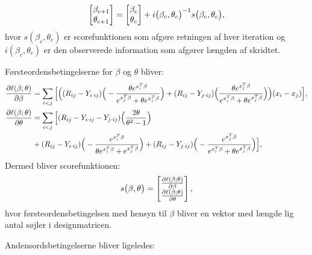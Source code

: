 \documentclass[11pt,a4paper]{article}
\begin{document}
\begin{align*}
\begin{bmatrix} \beta_{c+1}\\\theta_{c+1}\end{bmatrix} = \begin{bmatrix} \beta_c\\\theta_c\end{bmatrix} + i\big{(}\beta_c,\theta_c\big{)}^{-1}s\big{(}\beta_c,\theta_c\big{)},
\end{align*}
hvor $s(\beta_c,\theta_c)$ er scorefunktionen som afgøre retningen af hver iteration og $i(\beta_c,\theta_c)$ er den observerede information som afgører længden af skridtet. \par
Førsteordensbetingelserne for $\beta$ og $\theta$ bliver:
\begin{align*}
\frac{\partial \ell(\beta;\theta)}{\partial \beta}&= 
\sum_{i<j}\Big{[}\Big{(}
(R_{ij}-Y_{i\cdot ij})\Big{(}-\frac{\theta e^{x_i^T\beta}}{e^{x_j^T\beta}+\theta e^{x_i^T\beta}}\Big{)}+(R_{ij}-Y_{j\cdot ij})\Big{(}\frac{\theta e^{x_j^T\beta}}{e^{x_i^T\beta}+\theta e^{x_j^T\beta}}\Big{)}\Big{)}(x_i-x_j)\Big{]},\\
\frac{\partial \ell(\beta;\theta)}{\partial \theta}&=
\sum_{i<j}
\Big{[}
 (R_{ij}-Y_{i\cdot ij}-Y_{j\cdot ij})\Big{(}\frac{2\theta}{\theta^2-1}\Big{)}\\
 &+(R_{ij}-Y_{i\cdot ij})\Big{(}-\frac{e^{x_i^T\beta}}{\theta e^{x_i^T\beta}+e^{x_j^T\beta}}\Big{)}
 +(R_{ij}-Y_{j\cdot ij})\Big{(}-\frac{e^{x_j^T\beta}}{e^{x_i^T\beta}+\theta e^{x_j^T\beta}}\Big{)}
\Big{]},\\
\end{align*}
Dermed bliver scorefunktionen:
\begin{equation}
s\big{(}\beta,\theta\big{)} = \begin{bmatrix}
\frac{\partial \ell(\beta;\theta)}{\partial \beta}\\
\frac{\partial \ell(\beta;\theta)}{\partial \theta}
\end{bmatrix},
\label{score}
\end{equation}
hvor førsteordensbetingelsen med hensyn til $\beta$ bliver en vektor med længde lig antal søjler i designmatricen. 
\par Andensordsbetingelserne bliver ligeledes: 
\end{document}
